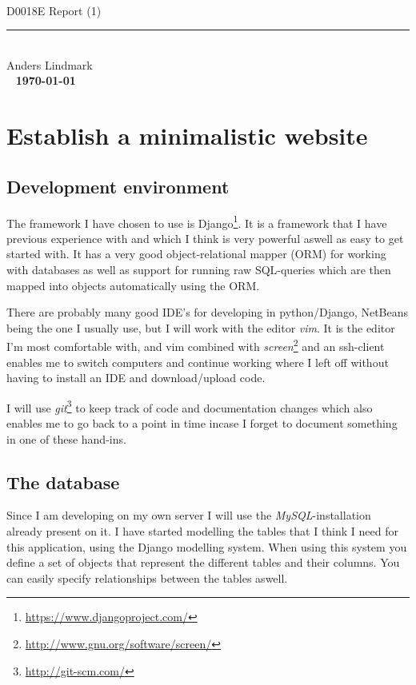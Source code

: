 \documentclass[12pt, a4paper,titlepage]{article}
\begin{document}
\ifpdf
{}
\else
{}
\fi

\begin{titlepage}
\ 
\begin{center}
\vfill
{\huge\sffamily D0018E Report (1)}
\rule{\linewidth}{0.3mm}\\
Anders Lindmark \\
\vfill
\ 
\vfill
{\textbf{\today}}
\end{center}
\end{titlepage}

\tableofcontents
\newpage

\section{Establish a minimalistic website}
\subsection{Development environment}
The framework I have chosen to use is
Django\footnote{\url{https://www.djangoproject.com/}}. 
It is a framework that I have previous experience with and which I think is
very powerful aswell as easy to get started with.
It has a very good object-relational mapper (ORM) for working with databases as well
as support for running raw SQL-queries which are then mapped into objects
automatically using the ORM.

There are probably many good IDE's for developing in python/Django, NetBeans
being the one I usually use, but I will work with the editor \emph{vim}. It is the 
editor I'm most comfortable with, and vim combined with
\emph{screen}\footnote{\url{http://www.gnu.org/software/screen/}} and an
ssh-client enables me to switch computers and continue working where I left
off without having to install an IDE and download/upload code.

I will use \emph{git}\footnote{\url{http://git-scm.com/}} to keep track of code
and documentation changes which also enables me to go back to a point in
time incase I forget to document something in one of these hand-ins.

\subsection{The database}
Since I am developing on my own server I will use the 
\emph{MySQL}-installation already present on it.
I have started modelling the tables that I think I need for this application, using
the Django modelling system. When using this system you define a set of 
objects that represent the different tables and their columns. You can easily
specify relationships between the tables aswell. 
\end{document}
